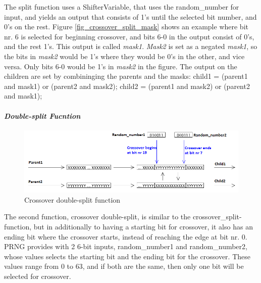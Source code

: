 The split function uses a ShifterVariable, that uses the random\_number for input, and yields an output that consists of 1's until the selected bit number, and 0's on the rest. Figure \ref{fig_crossover_split_mask} shows an example where bit nr. 6 is selected for beginning crossover, and bits 6-0 in the output consist of 0's, and the rest 1's. This output is called \emph{mask1}. \emph{Mask2} is set as a negated \emph{mask1}, so the bits in \emph{mask2} would be 1's where they would be 0's in the other, and vice versa. Only bits 6-0 would be 1's in \emph{mask2} in the figure. The output on the children are set by combininging the parents and the masks:
\linebreak child1 \<= (parent1 and mask1) or (parent2 and mask2);
\linebreak child2 \<= (parent1 and mask2) or (parent2 and mask1);


\paragraph{\textit{Double-split Fucntion}}
\begin{figure}[H]
\includegraphics[width=\textwidth]{fpga/fig/crossover_doublesplit.png}
\caption{Crossover double-split function}
\label{fig_crossover_doublesplit}
\end{figure}

The second function, crossover double-split, is similar to the crossover\_split-function, but in additionally to having a starting bit for crossover, it also has an ending bit where the crossover starts, instead of reaching the edge at bit nr. 0. PRNG provides with 2 6-bit inputs, random\_number1 and random\_number2, whose values selects the starting bit and the ending bit for the crossover. These values range from 0 to 63, and if both are the same, then only one bit will be selected for crossover.

